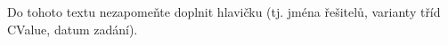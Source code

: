 
\begin{DoxyRefList}
\item[\label{todo__todo000001}%
\Hypertarget{todo__todo000001}%
page \hyperlink{index}{Úvod a zadání} ]Do tohoto textu nezapomeňte doplnit hlavičku (tj. jména řešitelů, varianty tříd {\ttfamily C\+Value}, datum zadání).
\end{DoxyRefList}